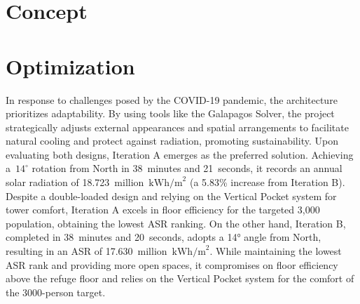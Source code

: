 \hfill
\begin{minipage}[t]{0.4\linewidth}
	\section*{%
	  Concept
	 }
	
	\vspace{\baselineskip}%
	
\end{minipage}
\vfill

\columnbreak%
\section*{%
  Optimization
 }
\begin{center}
	\noindent
	\begin{minipage}[t]{0.55\linewidth}
		
	\end{minipage}%
	\hfill
	\begin{minipage}[t]{0.4\linewidth}
		In response to challenges posed by the COVID-19 pandemic, the architecture prioritizes adaptability. By using tools like the Galapagos Solver, the project strategically adjusts external appearances and spatial arrangements to facilitate natural cooling and protect against radiation, promoting sustainability.
		\vspace{\baselineskip}%
		\newline%
		Upon evaluating both designs, Iteration A emerges as the preferred solution. Achieving a~$14^\circ$ rotation from North in 38~minutes and 21~seconds, it records an annual solar radiation of 18.723~million~$\text{kWh/m}^2$ (a 5.83\% increase from Iteration B). Despite a double-loaded design and relying on the Vertical Pocket system for tower comfort, Iteration A excels in floor efficiency for the targeted 3{,}000 population, obtaining the lowest ASR ranking.
		\vspace{\baselineskip}%
		\newline%
		On the other hand, Iteration B, completed in 38~minutes and 20~seconds, adopts a 14° angle from North, resulting in an ASR of 17.630~million~$\text{kWh/m}^2$. While maintaining the lowest ASR rank and providing more open spaces, it compromises on floor efficiency above the refuge floor and relies on the Vertical Pocket system for the comfort of the 3000-person target.
	\end{minipage}
\end{center}
